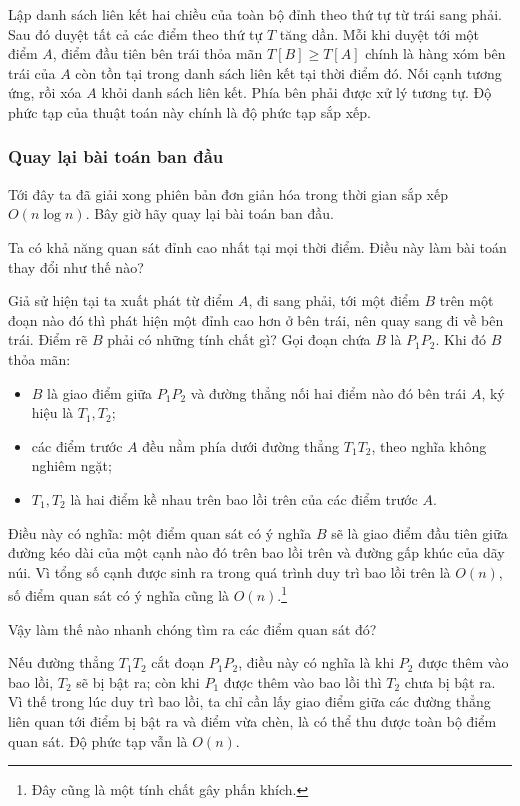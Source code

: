 \documentclass[11pt]{article}
\begin{document}
Lập danh sách liên kết hai chiều của toàn bộ đỉnh theo thứ tự từ trái sang
phải. Sau đó duyệt tất cả các điểm theo thứ tự \(T\) tăng dần. Mỗi khi duyệt
tới một điểm \(A\), điểm đầu tiên bên trái thỏa mãn \(T[B]\ge T[A]\) chính là
hàng xóm bên trái của \(A\) còn tồn tại trong danh sách liên kết tại thời
điểm đó. Nối cạnh tương ứng, rồi xóa \(A\) khỏi danh sách liên kết. Phía bên
phải được xử lý tương tự. Độ phức tạp của thuật toán này chính là độ phức tạp
sắp xếp.

\subsubsection{Quay lại bài toán ban đầu}

Tới đây ta đã giải xong phiên bản đơn giản hóa trong thời gian sắp xếp
\(O(n\log n)\). Bây giờ hãy quay lại bài toán ban đầu.

Ta có khả năng quan sát đỉnh cao nhất tại mọi thời điểm. Điều này làm bài
toán thay đổi như thế nào?

Giả sử hiện tại ta xuất phát từ điểm \(A\), đi sang phải, tới một điểm \(B\)
trên một đoạn nào đó thì phát hiện một đỉnh cao hơn ở bên trái, nên quay sang
đi về bên trái. Điểm rẽ \(B\) phải có những tính chất gì? Gọi đoạn chứa \(B\)
là \(P_1P_2\). Khi đó \(B\) thỏa mãn:
\begin{itemize}
  \item \(B\) là giao điểm giữa \(P_1P_2\) và đường thẳng nối hai điểm nào đó
  bên trái \(A\), ký hiệu là \(T_1,T_2\);
  \item các điểm trước \(A\) đều nằm phía dưới đường thẳng \(T_1T_2\), theo
  nghĩa không nghiêm ngặt;
  \item \(T_1,T_2\) là hai điểm kề nhau trên bao lồi trên của các điểm trước
  \(A\).
\end{itemize}

Điều này có nghĩa: một điểm quan sát có ý nghĩa \(B\) sẽ là giao điểm đầu
tiên giữa đường kéo dài của một cạnh nào đó trên bao lồi trên và đường gấp
khúc của dãy núi. Vì tổng số cạnh được sinh ra trong quá trình duy trì bao
lồi trên là \(O(n)\), số điểm quan sát có ý nghĩa cũng là
\(O(n)\).\footnote{Đây cũng là một tính chất gây phấn khích.}

Vậy làm thế nào nhanh chóng tìm ra các điểm quan sát đó?

Nếu đường thẳng \(T_1T_2\) cắt đoạn \(P_1P_2\), điều này có nghĩa là khi
\(P_2\) được thêm vào bao lồi, \(T_2\) sẽ bị bật ra; còn khi \(P_1\) được
thêm vào bao lồi thì \(T_2\) chưa bị bật ra. Vì thế trong lúc duy trì bao
lồi, ta chỉ cần lấy giao điểm giữa các đường thẳng liên quan tới điểm bị bật
ra và điểm vừa chèn, là có thể thu được toàn bộ điểm quan sát. Độ phức tạp
vẫn là \(O(n)\).
\end{document}
